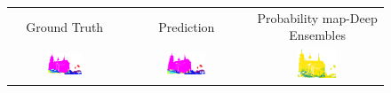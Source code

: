     \begin{figure}[h!]
        \centering
        \begin{tabular}{ccc}
            Ground Truth & Prediction & Probability map-Deep Ensembles \\
            \includegraphics[width=0.33\textwidth, height=0.18\textheight]{images/seg_output/sem3d_seg_output/1_GT.png} &
            \includegraphics[width=0.33\textwidth, height=0.18\textheight]{images/seg_output/sem3d_seg_output/1_Pred.png}& 
            \includegraphics[width=0.33\textwidth, height=0.18\textheight]{images/seg_output/sem3d_seg_output/1_max_prob.png}\\


\end{tabular}
\end{figure}
